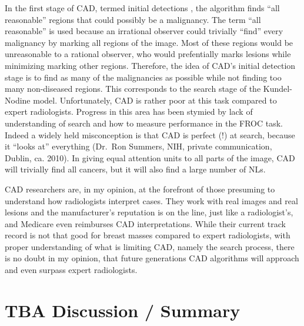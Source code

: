 \documentclass[
]{book}
\begin{document}
In the first stage of CAD, termed initial detections \citep{edwards2002maximum}, the algorithm finds ``all reasonable'' regions that could possibly be a malignancy. The term ``all reasonable'' is used because an irrational observer could trivially ``find'' every malignancy by marking all regions of the image. Most of these regions would be unreasonable to a rational observer, who would prefentially marks lesions while minimizing marking other regions. Therefore, the idea of CAD's initial detection stage is to find as many of the malignancies as possible while not finding too many non-diseased regions. This corresponds to the search stage of the Kundel-Nodine model. Unfortunately, CAD is rather poor at this task compared to expert radiologists. Progress in this area has been stymied by lack of understanding of search and how to measure performance in the FROC task. Indeed a widely held misconception is that CAD is perfect (!) at search, because it ``looks at'' everything (Dr.~Ron Summers, NIH, private communication, Dublin, ca. 2010). In giving equal attention units to all parts of the image, CAD will trivially find all cancers, but it will also find a large number of NLs.

CAD researchers are, in my opinion, at the forefront of those presuming to understand how radiologists interpret cases. They work with real images and real lesions and the manufacturer's reputation is on the line, just like a radiologist's, and Medicare even reimburses CAD interpretations. While their current track record is not that good for breast masses compared to expert radiologists, with proper understanding of what is limiting CAD, namely the search process, there is no doubt in my opinion, that future generations CAD algorithms will approach and even surpass expert radiologists.

\hypertarget{visual-search-discussion-summary}{%
\section{TBA Discussion / Summary}\label{visual-search-discussion-summary}}
\end{document}
